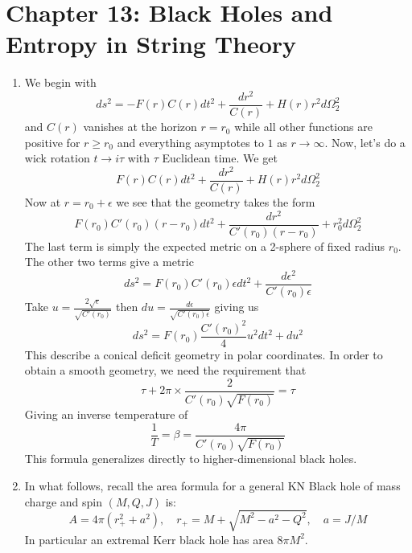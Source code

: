 \documentclass[11pt, class=article, crop=false]{standalone}
\begin{document}
\section*{Chapter 13: Black Holes and Entropy in String Theory} %
\label{sec:chapter_13_black_holes_and_entropy_in_string_theory}
\begin{enumerate}
	\item We begin with
	\[
		ds^2 = - F(r) C(r) dt^2 + \frac{dr^2}{C(r)} + H(r) r^2 d\Omega_2^2
	\]
	and $C(r)$ vanishes at the horizon $r = r_0$ while all other functions are positive for $r \geq r_0$ and everything asymptotes to $1$ as $r \to \infty$. Now, let's do a wick rotation $t \to i \tau$ with $\tau$ Euclidean time. We get
	\[
		F(r) C(r) dt^2 + \frac{dr^2}{C(r)} + H(r) r^2 d\Omega_2^2
	\]
	Now at $r = r_0 + \epsilon$ we see that the geometry takes the form
	\[
		F(r_0) C'(r_0) (r-r_0) dt^2 + \frac{dr^2}{C'(r_0) (r-r_0)} + r_0^2 d\Omega_2^2
	\]
	The last term is simply the expected metric on a 2-sphere of fixed radius $r_0$. The other two terms give a metric
	\[
		ds^2 = F(r_0) C'(r_0) \epsilon dt^2 + \frac{d \epsilon^2}{C'(r_0) \epsilon}
	\]
	Take $u = \frac{2 \sqrt{\epsilon}}{\sqrt{C'(r_0)}}$ then $du = \frac{d\epsilon}{\sqrt{C'(r_0) \epsilon}}$ giving us
	\[
		ds^2 = F(r_0) \frac{C'(r_0)^2}{4} u^2 dt^2 + du^2
	\]
	This describe a conical deficit geometry in polar coordinates. In order to obtain a smooth geometry, we need the requirement that 
	\[
		\tau + 2 \pi \times \frac{2}{C'(r_0) \sqrt{F(r_0)}}  = \tau 
	\]
	Giving an inverse temperature of 
	\[
		\frac1T = \beta =  \frac{4 \pi}{C'(r_0) \sqrt{F(r_0)}}
	\]
	This formula generalizes directly to higher-dimensional black holes.
	
	\item 
	In what follows, recall the area formula for a general KN Black hole of mass charge and spin $(M, Q, J)$ is:
	\[
		A = 4 \pi (r_+^2 + a^2), \quad r_+ = M + \sqrt{M^2 - a^2 - Q^2}, \quad a = J/M
	\]
	In particular an extremal Kerr black hole has area $8 \pi M^2$. 
	

\end{enumerate}
\end{document}
